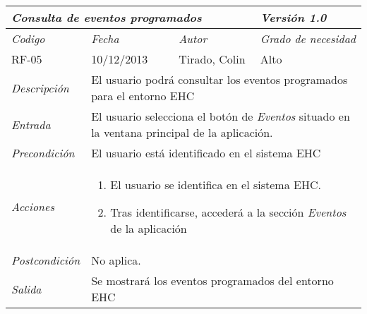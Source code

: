 \begin{center}
    \begin{tabular}{|p{3cm}|p{4cm}|p{4cm}|p{4cm}|}
    \hline \multicolumn{3}{|p{9cm}|}{\textit{Consulta de eventos programados}} & \textit{Versi\'on 1.0} \\
    \hline \textit{Codigo} & \textit{Fecha} & \textit{Autor} & \textit{Grado de necesidad} \\
    RF-05 & 10/12/2013 & Tirado, Colin & Alto \\
    \hline \textit{Descripci\'on} & \multicolumn{3}{|p{9cm}|}{El usuario podr\'a consultar los eventos programados para el entorno EHC} \\
    \hline \textit{Entrada} & \multicolumn{3}{|p{9cm}|}{El usuario selecciona el bot\'on de \textit{Eventos} situado en la ventana principal de la aplicaci\'on.} \\
    \hline \textit{Precondici\'on} & \multicolumn{3}{|p{9cm}|}{El usuario est\'a identificado en el sistema EHC} \\
    \hline \textit{Acciones} & \multicolumn{3}{|p{9cm}|}{
    \begin{enumerate}
    \item El usuario se identifica en el sistema EHC.
    \item Tras identificarse, acceder\'a a la secci\'on \textit{Eventos} de la aplicaci\'on
    \end{enumerate}
    } \\
    \hline \textit{Postcondici\'on} & \multicolumn{3}{|p{9cm}|}{No aplica.} \\
    \hline \textit{Salida} & \multicolumn{3}{|p{9cm}|}{Se mostrará los eventos programados del entorno EHC} \\ \hline
    \end{tabular}
\end{center}
